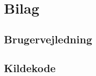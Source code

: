 \documentclass[a4paper]{article}
\begin{document}
  \section{Bilag}
     
      \subsection{Brugervejledning} \label{ssec:manual}
        
      \subsection{Kildekode} \label{ssec:sourceCode}
        
        
        
\end{document}
